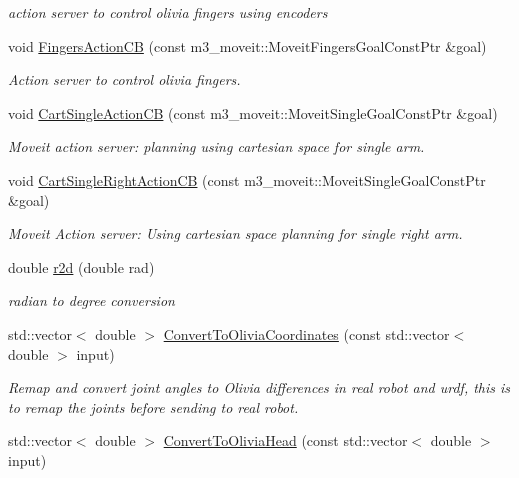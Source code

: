 \begin{DoxyCompactItemize}
\begin{DoxyCompactList}\small\item\em action server to control olivia fingers using encoders \end{DoxyCompactList}\item 
void \hyperlink{classM3MoveGroup_a50f3c0ec424696c8d613cbfb18829384}{Fingers\+Action\+CB} (const m3\+\_\+moveit\+::\+Moveit\+Fingers\+Goal\+Const\+Ptr \&goal)
\begin{DoxyCompactList}\small\item\em Action server to control olivia fingers. \end{DoxyCompactList}\item 
void \hyperlink{classM3MoveGroup_a71fc79c75e8e96881d0cfa6629f5e11d}{Cart\+Single\+Action\+CB} (const m3\+\_\+moveit\+::\+Moveit\+Single\+Goal\+Const\+Ptr \&goal)
\begin{DoxyCompactList}\small\item\em Moveit action server\+: planning using cartesian space for single arm. \end{DoxyCompactList}\item 
void \hyperlink{classM3MoveGroup_a6ce4ef5d30fc1e93826f4f8104f8db04}{Cart\+Single\+Right\+Action\+CB} (const m3\+\_\+moveit\+::\+Moveit\+Single\+Goal\+Const\+Ptr \&goal)
\begin{DoxyCompactList}\small\item\em Moveit Action server\+: Using cartesian space planning for single right arm. \end{DoxyCompactList}\item 
double \hyperlink{classM3MoveGroup_a08ae3af12542a9dd44d5f823c8b3bb46}{r2d} (double rad)
\begin{DoxyCompactList}\small\item\em radian to degree conversion \end{DoxyCompactList}\item 
std\+::vector$<$ double $>$ \hyperlink{classM3MoveGroup_a76eed72085b10fa6fea6f9cc773a7901}{Convert\+To\+Olivia\+Coordinates} (const std\+::vector$<$ double $>$ input)
\begin{DoxyCompactList}\small\item\em Remap and convert joint angles to Olivia differences in real robot and urdf, this is to remap the joints before sending to real robot. \end{DoxyCompactList}\item 
std\+::vector$<$ double $>$ \hyperlink{classM3MoveGroup_a59d8555d6560673417be20d6bf5d6aae}{Convert\+To\+Olivia\+Head} (const std\+::vector$<$ double $>$ input)

\end{DoxyCompactItemize}

